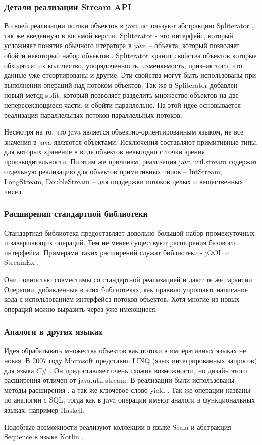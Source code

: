 \subsubsection{Детали реализации Stream API}
В своей реализации потоки объектов в java используют абстракцию Spliterator 
\cite{java:spliterator}, так же введенную в восьмой версии. Spliterator - это интерфейс, 
который усложняет понятие обычного итератора в java -- объекта, который позволяет обойти 
некоторый набор объектов \cite{java:iterator}. Spliterator хранит свойства объектов которые 
обходятся: их количество, упорядоченность, изменяемость, признак того, что данные уже 
отсортированы и другие. Эти свойства могут быть использованы при выполнении операций над 
потоком объектов. Так же в Spliterator добавлен новый метод split, который позволяет 
разделить множество объектов на две непересекающиеся части, и обойти параллельно. На этой идее основывается реализация параллельных потоков параллельных потоков.

Несмотря на то, что java является объектно-ориентированным языком, не все значения в java 
являются объектами. Исключения составляют примитивные типы, для которых хранение в виде 
объектов невыгодно с точки зрения производительности. По этим же причинам, реализация 
java.util.stream содержит отдельную реализацию для объектов примитивных типов -- IntStream, 
LongStream, DoubleStream -- для поддержки потоков целых и вещественных чисел. 

\subsubsection{Расширения стандартной библиотеки}
Стандартная библиотека предоставляет довольно большой набор промежуточных и завершающих операций. Тем не менее существуют расширения базового интерфейса. Примерами таких расширений служат библиотеки - jOOL \cite{java:jool} и StreamEx \cite{java:streamex}.

Они полностью совместимы со стандартной реализацией и дают те же гарантии. Операции, добавленные в этих библиотеках, как правило упрощают написание кода с использованием интерфейса потоков объектов. Хотя многие из новых операций можно выразить через уже имеющиеся.

\subsubsection{Аналоги в других языках}
Идея обрабатывать множества объектов как потоки в императивных языках не новая. В 2007 году Microsoft представил LINQ (язык интегрированных запросов) для языка $C\#$ \cite{ms:linq}. Он предоставляет очень схожие возможности, но дизайн этого расширения отличен от java.util.stream. В реализации были использованы методы-расширения \cite{ms:ext}, а так же ключевое слово yield \cite{ms:yield}. Так же операции названы по аналогии с SQL, тогда как в java операции имеют аналоги в функциональных языках, например Haskell.

Подобные возможности реализуют коллекции в языке Scala \cite{ho:scala} и абстракция Sequence в языке Kotlin \cite{ho:kotlin}.